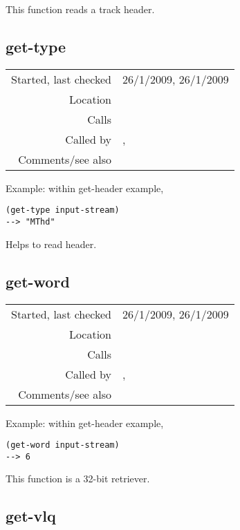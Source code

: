 \noindent This function reads a track header.


\subsection*{get-type}\label{fun:get-type}

\vspace{0.3cm}
\begin{tabular}{r|p{8cm}}
Started, last checked & 26/1/2009, 26/1/2009 \\
Location & \nameref{sec:MIDI-import} \\
Calls & \\
Called by & \nameref{fun:get-header}, \nameref{fun:get-track-header} \\
Comments/see also &
\end{tabular}

\vspace{0.5cm}
\noindent Example: within get-header example,
\begin{verbatim}
(get-type input-stream)
--> "MThd"
\end{verbatim}

\noindent Helps to read header.


\subsection*{get-word}\label{fun:get-word}

\vspace{0.3cm}
\begin{tabular}{r|p{8cm}}
Started, last checked & 26/1/2009, 26/1/2009 \\
Location & \nameref{sec:MIDI-import} \\
Calls & \\
Called by & \nameref{fun:get-header}, \nameref{fun:get-track-header} \\
Comments/see also & \nameref{fun:get-short}
\end{tabular}

\vspace{0.5cm}
\noindent Example: within get-header example,
\begin{verbatim}
(get-word input-stream)
--> 6
\end{verbatim}

\noindent This function is a 32-bit retriever.


\subsection*{get-vlq}\label{fun:get-vlq}

